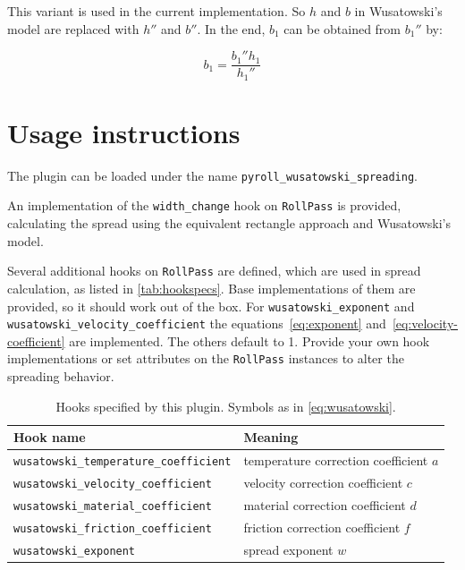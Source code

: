 \documentclass[11pt]{PyRollDocs}
\begin{document}
    This variant is used in the current implementation.
    So $h$ and $b$ in Wusatowski's model are replaced with $h''$ and $b''$.
    In the end, $b_1$ can be obtained from $b_1''$ by:

    \[
        b_1 = \frac{b_1'' h_1}{h_1''}
    \]


    \section{Usage instructions}\label{sec:usage-instructions}

    The plugin can be loaded under the name \texttt{pyroll\_wusatowski\_spreading}.

    An implementation of the \lstinline{width_change} hook on \lstinline{RollPass} is provided,
    calculating the spread using the equivalent rectangle approach and Wusatowski's model.

    Several additional hooks on \lstinline{RollPass} are defined, which are used in spread calculation, as listed in \autoref{tab:hookspecs}.
    Base implementations of them are provided, so it should work out of the box.
    For \lstinline{wusatowski_exponent} and \lstinline{wusatowski_velocity_coefficient} the equations~\ref{eq:exponent} and~\ref{eq:velocity-coefficient} are implemented.
    The others default to \num{1}.
    Provide your own hook implementations or set attributes on the \lstinline{RollPass} instances to alter the spreading behavior.

    \begin{table}
        \centering
        \caption{Hooks specified by this plugin. Symbols as in \autoref{eq:wusatowski}.}
        \label{tab:hookspecs}
        \begin{tabular}{ll}
            \toprule
            Hook name                                     & Meaning                                \\
            \midrule
            \texttt{wusatowski\_temperature\_coefficient} & temperature correction coefficient $a$ \\
            \texttt{wusatowski\_velocity\_coefficient}    & velocity correction coefficient $c$    \\
            \texttt{wusatowski\_material\_coefficient}    & material correction coefficient $d$    \\
            \texttt{wusatowski\_friction\_coefficient}    & friction correction coefficient $f$    \\
            \texttt{wusatowski\_exponent}                 & spread exponent $w$                    \\
            \bottomrule
        \end{tabular}
    \end{table}

    \printbibliography
\end{document}
